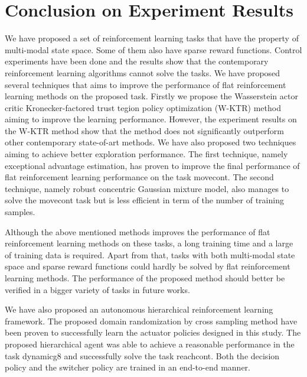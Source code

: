 \section{Conclusion on Experiment Results}
We have proposed a set of reinforcement learning tasks that have the property of multi-modal state space. Some of them also have sparse reward functions. Control experiments have been done and the results show that the contemporary reinforcement learning algorithms cannot solve the tasks.
We have proposed several techniques that aims to improve the performance of flat reinforcement learning methods on the proposed task. Firstly we propose the Wasserstein actor critic Kronecker-factored trust tegion policy optimization (W-KTR) method aiming to improve the learning performance. However, the experiment results on the W-KTR method show that the method does not significantly outperform other contemporary state-of-art methods. We have also proposed two techniques aiming to achieve better exploration performance. The first technique, namely exceptional advantage estimation, has proven to improve the final performance of flat reinforcement learning performance on the task movecont. The second technique, namely robust concentric Gaussian mixture model, also manages to solve the movecont task but is less efficient in term of the number of training samples. 

Although the above mentioned methods improves the performance of flat reinforcement learning methods on these tasks, a long training time and a large of training data is required. Apart from that, tasks with both multi-modal state space and sparse reward functions could hardly be solved by flat reinforcement learning methods. The performance of the proposed method should better be verified in a bigger variety of tasks in future works.

We have also proposed an autonomous hierarchical reinforcement learning framework. The proposed domain randomization by cross sampling method have been proven to successfully learn the actuator policies designed in this study. The proposed hierarchical agent was able to achieve a reasonable performance in the task dynamicg8 and successfully solve the task reachcont. Both the decision policy and the switcher policy are trained in an end-to-end manner. 